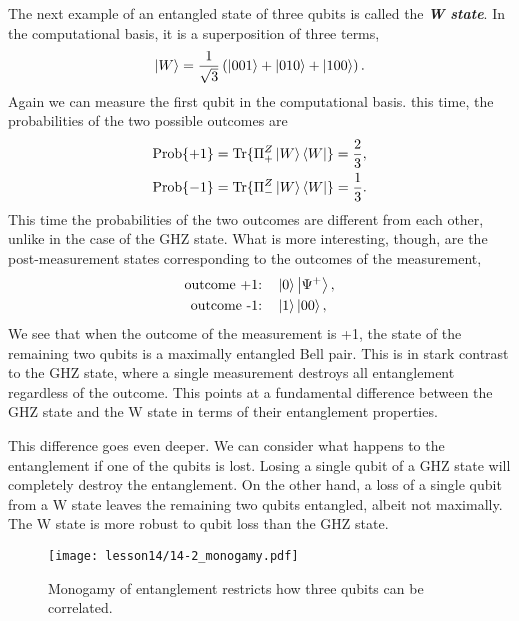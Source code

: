 The next example of an entangled state of three qubits is called the \textit{\textbf{W state}}.
In the computational basis, it is a superposition of three terms,
\begin{equation}
    \left| W \right\rangle = \frac{1}{\sqrt{3}} \left( \left| 001 \right\rangle + \left| 010 \right\rangle + \left| 100 \right\rangle \right).
\end{equation}
Again we can measure the first qubit in the computational basis.
this time, the probabilities of the two possible outcomes are
\begin{align}
    \text{Prob}\{+1\} & = \text{Tr} \{ \Pi^Z_+ \left| W \right\rangle\left\langle W \right| \} = \frac{2}{3}, \\
    \text{Prob}\{-1\} & = \text{Tr} \{ \Pi^Z_- \left| W \right\rangle\left\langle W \right| \} = \frac{1}{3}.
\end{align}
This time the probabilities of the two outcomes are different from each other, unlike in the case of the GHZ state.
What is more interesting, though, are the post-measurement states corresponding to the outcomes of the measurement,
\begin{align}
    \text{outcome +1:} & \quad \left| 0 \right\rangle\left| \Psi^+ \right\rangle, \label{eq:14-2_W_post_meas_0} \\
    \text{outcome -1:} & \quad \left| 1 \right\rangle\left| 00 \right\rangle,
\end{align}
We see that when the outcome of the measurement is +1, the state of the remaining two qubits is a maximally entangled Bell pair.
This is in stark contrast to the GHZ state, where a single measurement destroys all entanglement regardless of the outcome.
This points at a fundamental difference between the GHZ state and the W state in terms of their entanglement properties.

This difference goes even deeper.
We can consider what happens to the entanglement if one of the qubits is lost.
Losing a single qubit of a GHZ state will completely destroy the entanglement.
On the other hand, a loss of a single qubit from a W state leaves the remaining two qubits entangled, albeit not maximally.
The W state is more robust to qubit loss than the GHZ state.

\begin{figure}[t]
    \centering
    \texttt{[image: lesson14/14-2\_monogamy.pdf]}
    \caption[Monogamy of entanglement.]{Monogamy of entanglement restricts how three qubits can be correlated.}
    \label{fig:14-2_monogamy}
\end{figure}

